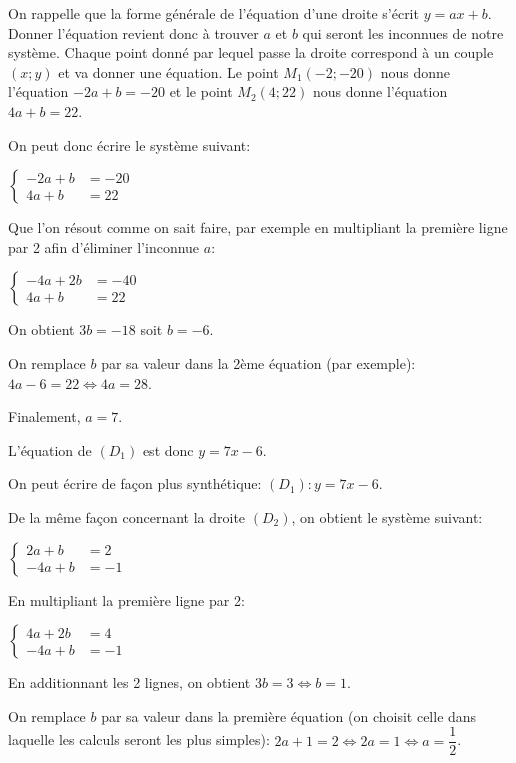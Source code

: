 \documentclass[a4paper,12pt]{scrartcl}
\begin{document}
On rappelle que la forme générale de l'équation d'une droite s'écrit $y = ax+b$. Donner l'équation revient donc à trouver $a$ et $b$ qui seront les inconnues de notre système. Chaque point donné par lequel passe la droite correspond à un couple $(x;y)$ et va donner une équation. Le point $M_1 (-2;-20)$ nous donne l'équation $-2a + b = -20$ et le point $M_2 (4;22)$ nous donne l'équation $4a + b = 22$.

On peut donc écrire le système suivant:

$
\begin{cases}
-2a + b &= -20\\ 
4a + b &= 22
\end{cases}$

Que l'on résout comme on sait faire, par exemple en multipliant la première ligne par 2 afin d'éliminer l'inconnue $a$: 

$
\begin{cases}
-4a + 2b &= -40\\ 
4a + b &= 22
\end{cases}$

On obtient $3b = -18$ soit $b = -6$. 

On remplace $b$ par sa valeur dans la 2ème équation (par exemple): $4a - 6 = 22 \Leftrightarrow 4a = 28$.

Finalement, $a = 7$. 

L'équation de $(D_1)$ est donc $y = 7x - 6$. 

On peut écrire de façon plus synthétique: $(D_1):y = 7x - 6$.


De la même façon concernant la droite $(D_2)$, on obtient le système suivant:

$
\begin{cases}
2a + b &= 2\\ 
-4a + b &= -1
\end{cases}$

En multipliant la première ligne par 2:

$
\begin{cases}
4a + 2b &= 4\\ 
-4a + b &= -1
\end{cases}$

En additionnant les 2 lignes, on obtient $3b = 3 \Leftrightarrow b = 1$.

On remplace $b$ par sa valeur dans la première équation (on choisit celle dans laquelle les calculs seront les plus simples): $2a + 1 = 2 \Leftrightarrow 2a = 1 \Leftrightarrow a = \dfrac{1}{2}$.
\end{document}
